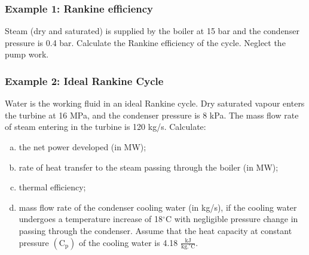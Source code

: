 \documentclass[10pt,compress]{beamer}
\begin{document}
\begin{frame}
\begin{columns}
\begin{column}[c]{0.5\linewidth}
{\begin{figure}
\begin{center}
           \end{center}
         \end{figure}}
      \end{column}
   \end{columns}
 \normalsize
\end{frame}


\begin{frame}
 \frametitle{Example 1: Rankine efficiency}
    Steam (dry and saturated) is supplied by the boiler at 15 bar and the condenser pressure is 0.4 bar. Calculate the Rankine efficiency of the cycle. Neglect the pump work.
\end{frame}

\begin{frame}
 \frametitle{Example 2: Ideal Rankine Cycle}
Water is the working fluid in an ideal Rankine cycle. Dry saturated vapour enters the turbine at 16 MPa, and the condenser pressure is 8 kPa. The mass flow rate of steam entering in the turbine is 120 kg/s. Calculate:
\begin{enumerate}[(a)]
\item the net power developed (in MW);
\item rate of heat transfer to the steam passing through the boiler (in MW);
\item thermal efficiency;
\item mass flow rate of the condenser cooling water (in kg/s), if the cooling water undergoes a temperature increase of 18$^{\circ}$C with negligible pressure change in passing through the condenser. Assume that the heat capacity at constant pressure $\left(\text{C}_{\text{p}}\right)$ of the cooling water is 4.18 $\frac{\text{kJ}}{\text{kg.}^{\circ}\text{C}}$.
\end{enumerate} 
\end{frame}
\end{document}

